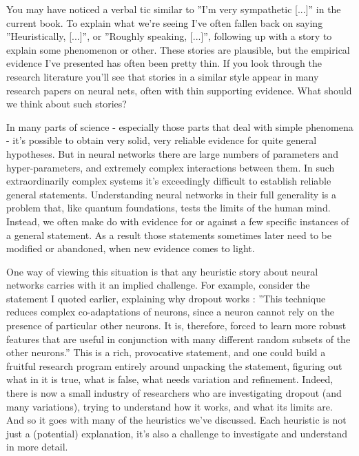 You may have noticed a verbal tic similar to ''I'm very sympathetic [...]'' in the current book. To explain what we're seeing I've often fallen back on saying ''Heuristically, [...]'', or ''Roughly speaking, [...]'', following up with a story to explain some phenomenon or other. These stories are plausible, but the empirical evidence I've presented has often been pretty thin. If you look through the research literature you'll see that stories in a similar style appear in many research papers on neural nets, often with thin supporting evidence. What should we think about such stories?
    
In many parts of science - especially those parts that deal with simple phenomena - it's possible to obtain very solid, very reliable evidence for quite general hypotheses. But in neural networks there are large numbers of parameters and hyper-parameters, and extremely complex interactions between them. In such extraordinarily complex systems it's exceedingly difficult to establish reliable general statements. Understanding neural networks in their full generality is a problem that, like quantum foundations, tests the limits of the human mind. Instead, we often make do with evidence for or against a few specific instances of a general statement. As a result those statements sometimes later need to be modified or abandoned, when new evidence comes to light.
    
One way of viewing this situation is that any heuristic story about neural networks carries with it an implied challenge. For example, consider the statement I quoted earlier, explaining why dropout works \cite{Krizhevsky2012}: ''This technique reduces complex co-adaptations of neurons, since a neuron cannot rely on the presence of particular other neurons. It is, therefore, forced to learn more robust features that are useful in conjunction with many different random subsets of the other neurons.'' This is a rich, provocative statement, and one could build a fruitful research program entirely around unpacking the statement, figuring out what in it is true, what is false, what needs variation and refinement. Indeed, there is now a small industry of researchers who are investigating dropout (and many variations), trying to understand how it works, and what its limits are. And so it goes with many of the heuristics we've discussed. Each heuristic is not just a (potential) explanation, it's also a challenge to investigate and understand in more detail.
    
